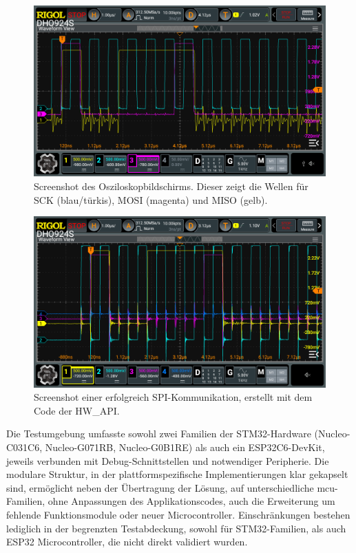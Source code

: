 \begin{figure}[H]
	\includegraphics[width=\textwidth]{Pics/oszi_cube_spi_example.png}
	\caption{Screenshot des Osziloskopbildschirms. Dieser zeigt die Wellen für SCK (blau/türkis), MOSI (magenta) und MISO (gelb).}
	\label{fig:oszi_cube_spi_example}
\end{figure}



\begin{figure}[H]
	\includegraphics[width=\textwidth]{Pics/spi_signal_test.png}
	\caption{Screenshot einer erfolgreich SPI-Kommunikation, erstellt mit dem Code der HW\_API.}
	\label{fig:oszi_spi_signal_test}
\end{figure}


Die Testumgebung umfasste sowohl zwei Familien der STM32-Hardware (Nucleo-C031C6, Nucleo-G071RB, Nucleo-G0B1RE) als auch ein ESP32C6-DevKit, jeweils verbunden mit Debug-Schnittstellen und notwendiger Peripherie.
Die modulare Struktur, in der plattformspezifische Implementierungen klar gekapselt sind, ermöglicht neben der Übertragung der Lösung, auf unterschiedliche \gls{mcu}-Familien, ohne Anpassungen des Applikationscodes, auch die Erweiterung um fehlende Funktionsmodule oder neuer Microcontroller.
Einschränkungen bestehen lediglich in der begrenzten Testabdeckung, sowohl für STM32-Familien, als auch ESP32 Microcontroller, die nicht direkt validiert wurden.


